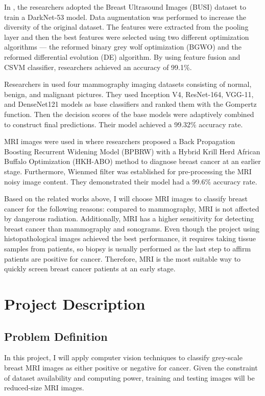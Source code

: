 \documentclass{article}
\begin{document}
In \cite{s22030807}, the researchers adopted the Breast Ultrasound Images (BUSI) dataset to train a DarkNet-53 model. Data augmentation was performed to increase the diversity of the original dataset. The features were extracted from the pooling layer and then the best features were selected using two different optimization algorithms --- the reformed binary grey wolf optimization (BGWO) and the reformed differential evolution (DE) algorithm. By using feature fusion and CSVM classifier, researchers achieved an accuracy of 99.1\%.

Researchers in \cite{diagnostics12081812} used four mammography imaging datasets consisting of normal, benign, and malignant pictures. They used Inception V4, ResNet-164, VGG-11, and DenseNet121 models as base classifiers and ranked them with the Gompertz function. Then the decision scores of the base models were adaptively combined to construct final predictions. Their model achieved a 99.32\% accuracy rate.

MRI images were used in \cite{Dewangan2022} where researchers proposed a Back Propagation Boosting Recurrent Widening Model (BPBRW) with a Hybrid Krill Herd African Buffalo Optimization (HKH-ABO) method to diagnose breast cancer at an earlier stage. Furthermore, Wienmed filter was established for pre-processing the MRI noisy image content. They demonstrated their model had a 99.6\% accuracy rate.

Based on the related works above, I will choose MRI images to classify breast cancer for the following reasons: compared to mammography, MRI is not affected by dangerous radiation. Additionally, MRI has a higher sensitivity for detecting breast cancer than mammography and sonograms. Even though the project using histopathological images achieved the best performance, it requires taking tissue samples from patients, so biopsy is usually performed as the last step to affirm patients are positive for cancer. Therefore, MRI is the most suitable way to quickly screen breast cancer patients at an early stage.

\section{Project Description}

\subsection{Problem Definition}
In this project, I will apply computer vision techniques to classify grey-scale breast MRI images as either positive or negative for cancer. Given the constraint of dataset availability and computing power, training and testing images will be reduced-size MRI images.
\end{document}
